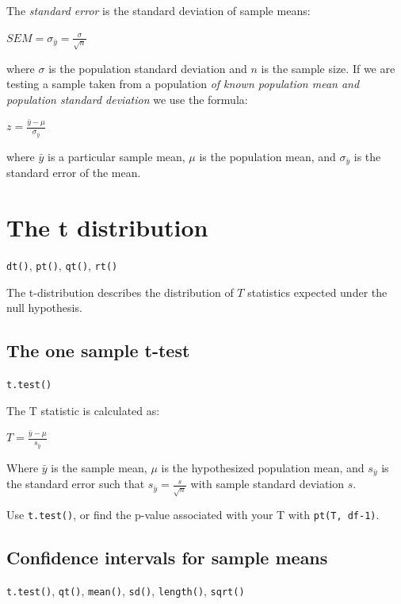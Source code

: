 \documentclass[
  11pt,
  a4paper,
]{book}
\begin{document}
The \emph{standard error} is the standard deviation of sample means:

\(SEM = \sigma_{\bar{y}} = \frac{\sigma}{\sqrt{n}}\)

where \(\sigma\) is the population standard deviation and \(n\) is the sample size. If we are testing a sample taken from a population \emph{of known population mean and population standard deviation} we use the formula:

\(z = \frac{\bar{y}-\mu}{\sigma_{\bar{y}}}\)

where \(\bar{y}\) is a particular sample mean, \(\mu\) is the population mean, and \(\sigma_{\bar{y}}\) is the standard error of the mean.

\hypertarget{the-t-distribution}{%
\section{The t distribution}\label{the-t-distribution}}

\texttt{dt()}, \texttt{pt()}, \texttt{qt()}, \texttt{rt()}

The t-distribution describes the distribution of \(T\) statistics expected under the null hypothesis.

\hypertarget{the-one-sample-t-test}{%
\subsection{The one sample t-test}\label{the-one-sample-t-test}}

\texttt{t.test()}

The T statistic is calculated as:

\(T = \frac{\bar{y}-\mu}{s_{\bar{y}}}\)

Where \(\bar{y}\) is the sample mean, \(\mu\) is the hypothesized population mean, and \(s_{\bar{y}}\) is the standard error such that \(s_{\bar{y}} = \frac{s}{\sqrt{n}}\) with sample standard deviation \(s\).

Use \texttt{t.test()}, or find the p-value associated with your T with \texttt{pt(T,\ df-1)}.

\hypertarget{confidence-intervals-for-sample-means}{%
\subsection{Confidence intervals for sample means}\label{confidence-intervals-for-sample-means}}

\texttt{t.test()}, \texttt{qt()}, \texttt{mean()}, \texttt{sd()}, \texttt{length()}, \texttt{sqrt()}
\end{document}

